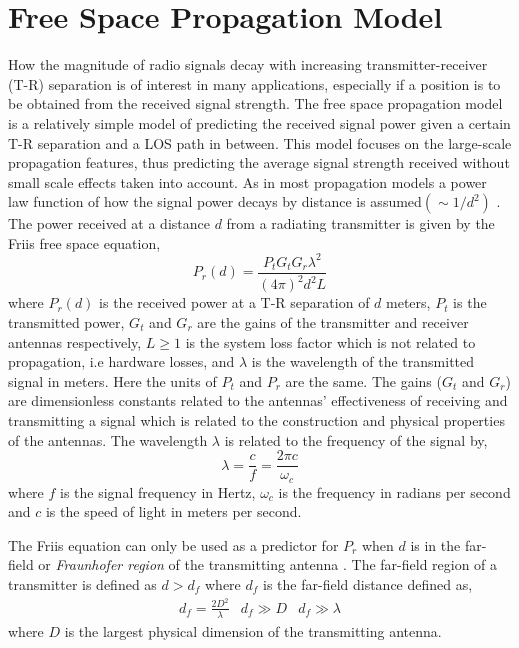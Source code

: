 \documentclass{LTHthesis}
\begin{document}
\section{Free Space Propagation Model}
%
How the magnitude of radio signals decay with increasing transmitter-receiver (T-R) separation is of interest in many applications, especially if a position is to be obtained from the received signal strength. The free space propagation model is a relatively simple model of predicting the received signal power given a certain T-R separation and a LOS path in between. This model focuses on the large-scale propagation features, thus predicting the average signal strength received without small scale effects taken into account. As in most propagation models a power law function of how the signal power decays by distance is assumed$\left(\sim{1/d^2}\right)$ \cite{rappaport96}. The power received at a distance $d$ from a radiating transmitter is given by the Friis free space equation,
%
\begin{equation}
P_r(d)=\frac{P_tG_tG_r\lambda^2}{(4\pi)^2d^2L}\label{equation:friis_equation}
\end{equation}
%
where $P_r(d)$ is the received power at a T-R separation of $d$ meters, $P_t$ is the transmitted power, $G_t$ and $G_r$ are the gains of the transmitter and receiver antennas respectively, $L\geq1$ is the system loss factor which is not related to propagation, i.e hardware losses, and $\lambda$ is the wavelength of the transmitted signal in meters. Here the units of $P_t$ and $P_r$ are the same. The gains ($G_t$ and $G_r$) are dimensionless constants related to the antennas' effectiveness of receiving and transmitting a signal which is related to the construction and physical properties of the antennas. The wavelength $\lambda$ is related to the frequency of the signal by,
\begin{equation}
\lambda=\frac{c}{f}=\frac{2\pi c}{\omega_c}
\end{equation} 
%
where $f$ is the signal frequency in Hertz, $\omega_c$ is the frequency in radians per second and $c$ is the speed of light in meters per second. 

The Friis equation can only be used as a predictor for $P_r$ when $d$ is in the far-field or \emph{Fraunhofer region} of the transmitting antenna \cite{rappaport96}. The far-field region of a transmitter is defined as $d>d_f$ where $d_f$ is the far-field distance defined as,
%
\begin{eqnarray}
d_f=\frac{2D^2}{\lambda} & d_f\gg D & d_f\gg \lambda \label{equation:frau_dist}
\end{eqnarray}
%
where $D$ is the largest physical dimension of the transmitting antenna.
\end{document}
